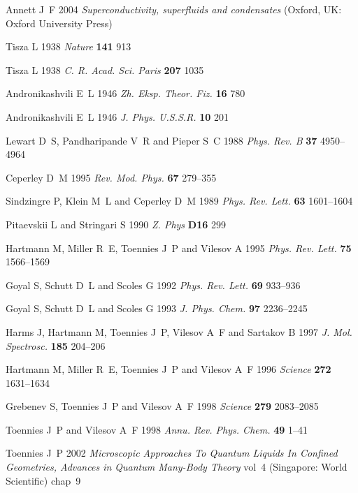 \documentclass[12pt]{iopart}
\begin{document}
\begin{thebibliography}{100}
Annett J~F 2004 {\em Superconductivity, superfluids and condensates\/} (Oxford,
  UK: Oxford University Press)

Tisza L 1938 {\em Nature\/} {\bf 141} 913

Tisza L 1938 {\em C. R. Acad. Sci. Paris\/} {\bf 207} 1035

Andronikashvili E~L 1946 {\em Zh. Eksp. Theor. Fiz.\/} {\bf 16} 780

Andronikashvili E~L 1946 {\em J. Phys. U.S.S.R.\/} {\bf 10} 201

Lewart D~S, Pandharipande V~R and Pieper S~C 1988 {\em Phys. Rev. B\/} {\bf 37}
  4950--4964

Ceperley D~M 1995 {\em Rev. Mod. Phys.\/} {\bf 67} 279--355

Sindzingre P, Klein M~L and Ceperley D~M 1989 {\em Phys. Rev. Lett.\/} {\bf 63}
  1601--1604

Pitaevskii L and Stringari S 1990 {\em Z. Phys\/} {\bf D16} 299

Hartmann M, Miller R~E, Toennies J~P and Vilesov A 1995 {\em Phys. Rev.
  Lett.\/} {\bf 75} 1566--1569

Goyal S, Schutt D~L and Scoles G 1992 {\em Phys. Rev. Lett.\/} {\bf 69}
  933--936

Goyal S, Schutt D~L and Scoles G 1993 {\em J. Phys. Chem.\/} {\bf 97}
  2236--2245

Harms J, Hartmann M, Toennies J~P, Vilesov A~F and Sartakov B 1997 {\em J. Mol.
  Spectrosc.\/} {\bf 185} 204--206

Hartmann M, Miller R~E, Toennies J~P and Vilesov A~F 1996 {\em Science\/} {\bf
  272} 1631--1634

Grebenev S, Toennies J~P and Vilesov A~F 1998 {\em Science\/} {\bf 279}
  2083--2085

Toennies J~P and Vilesov A~F 1998 {\em Annu. Rev. Phys. Chem.\/} {\bf 49} 1--41

Toennies J~P 2002 {\em Microscopic Approaches To Quantum Liquids In Confined
  Geometries, Advances in Quantum Many-Body Theory\/} vol~4 (Singapore: World
  Scientific) chap~9


\end{thebibliography}
\end{document}

